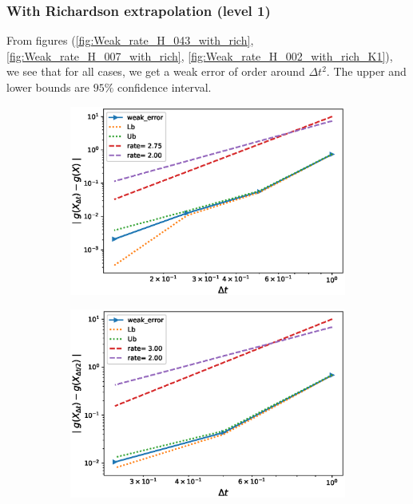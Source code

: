 \documentclass[11pt]{article}
\begin{document}
\FloatBarrier


\subsubsection{With Richardson extrapolation (level 1)}
From figures (\ref{fig:Weak_rate_H_043_with_rich}, \ref{fig:Weak_rate_H_007_with_rich}, \ref{fig:Weak_rate_H_002_with_rich_K1}), we see that for all cases, we get a weak error of order around $\Delta t^2$. The upper and lower bounds are $95\%$ confidence interval.
\begin{figure}[h!]
	\centering
	\begin{subfigure}{.4\textwidth}
		\centering
		\includegraphics[width=1\linewidth]{./figures/rBergomi_weak_error_rates/with_richardson/H_043/weak_convergence_order_Bergomi_H_043_K_1_M_10_6_richardson_relative}
		\caption{}
		\label{fig:sub3}
	\end{subfigure}%
	\begin{subfigure}{.4\textwidth}
		\centering
		\includegraphics[width=1\linewidth]{./figures/rBergomi_weak_error_rates/with_richardson/H_043/weak_convergence_order_differences_Bergomi_H_043_K_1_M_10_6_richardson_relative}
		\caption{}
		\label{fig:sub4}
	\end{subfigure}
	

\end{figure}
\end{document}
